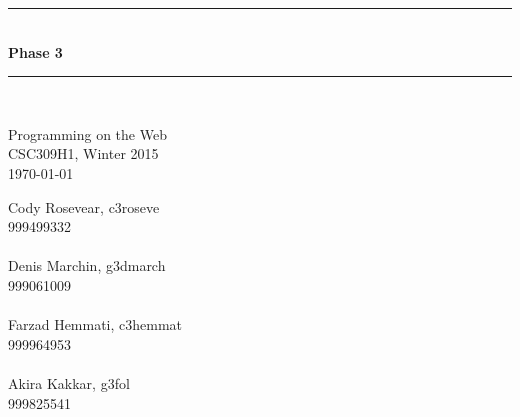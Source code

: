 \documentclass[12pt]{article}
\begin{document}
\begin{titlepage}
\newcommand{\HRule}{\rule{\linewidth}{0.5mm}} %
\center %
\HRule \\[0.4cm]
{ \huge \bfseries Phase 3}\\[0.4cm] %
\HRule \\[1.5cm]
\begin{minipage}{0.4\textwidth}
\begin{center} \large
Programming on the Web\\
CSC309H1, Winter 2015\\
\today
\end{center}
\end{minipage}
\vfill %
Cody Rosevear, c3roseve\\
999499332\\
\\
Denis Marchin, g3dmarch\\
999061009\\
\\
Farzad Hemmati, c3hemmat\\
999964953\\
\\
Akira Kakkar, g3fol\\
999825541\\
\\
\end{titlepage}
\newpage
\end{document}

